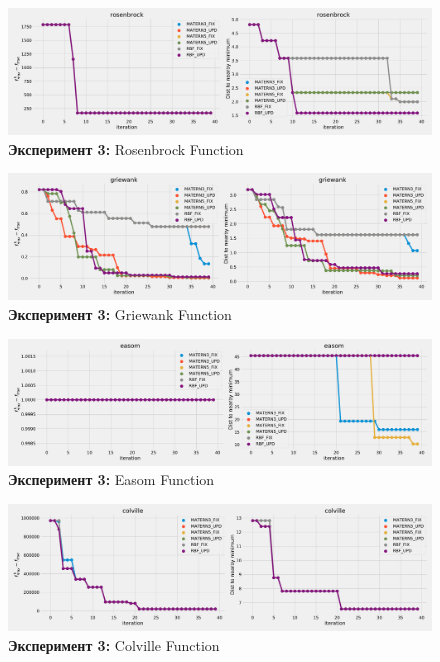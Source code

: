 \documentclass[12pt,fleqn]{article}
\begin{document}
	\begin{figure}[!h]
		\includegraphics[scale=0.25,center]{../code/exp3/rosenbrock.pdf}
		\caption{\textbf{Эксперимент 3:} Rosenbrock Function}
		\label{fig:exp3_rosenbrock}
	\end{figure}
	
	\begin{figure}[!h]
		\includegraphics[scale=0.25,center]{../code/exp3/griewank.pdf}
		\caption{\textbf{Эксперимент 3:} Griewank Function}
		\label{fig:exp3_griewank}
	\end{figure}

	\begin{figure}[!h]
		\includegraphics[scale=0.25,center]{../code/exp3/easom.pdf}
		\caption{\textbf{Эксперимент 3:} Easom Function}
		\label{fig:exp3_easom}
	\end{figure}
	
	\begin{figure}[!h]
		\includegraphics[scale=0.25,center]{../code/exp3/colville.pdf}
		\caption{\textbf{Эксперимент 3:} Colville Function}
		\label{fig:exp3_colville}
	\end{figure}
	
\end{document}
